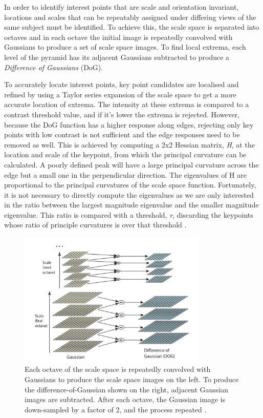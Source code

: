 \documentclass{l4proj}
\begin{document}
In order to identify interest points that are scale and orientation invariant, locations and scales that can be repeatably assigned under differing views of the same subject must be identified.  To achieve this, the scale space is separated into octaves and in each octave the initial image is repeatedly convolved with Gaussians to produce a set of scale space images. To find local extrema, each level of the pyramid has its adjacent Gaussians subtracted to produce a \textit{Difference of Gaussians} (DoG). 

To accurately locate interest points, key point candidates are localised and refined by using
a Taylor series expansion of the scale space to get a more accurate location of extrema. The
intensity at these extrema is compared to a contrast threshold value, and if it's lower the
extrema is rejected. However, because the DoG function has a higher response along edges,
rejecting only key points with low contrast is not sufficient and the edge responses need to be removed as well. This is achieved by computing a 2x2 Hessian matrix, \textit{H}, at the location and scale of the keypoint, from which the principal curvature can be calculated. A poorly defined peak will have a large principal curvature across the edge but a small one in the
perpendicular direction. The eigenvalues of H are proportional to the principal curvatures of
the scale space function. Fortunately, it is not necessary to directly compute the eigenvalues
as we are only interested in the ratio between the largest magnitude eigenvalue and the
smaller magnitude eigenvalue. This ratio is compared with a threshold, \textit{r}, discarding the
keypoints whose ratio of principle curvatures is over that threshold \citep{Lowe04}.

\begin{figure}[ht]
    \centering
    \includegraphics[width=0.8\textwidth]{l4template-master/images/gaussianPyramid.png}
    \caption{Each octave of the scale space is repeatedly convolved with Gaussians to produce the scale space images on the left. To produce the difference-of-Gaussian shown on the right, adjacent Gaussian images are subtracted. After each octave, the Gaussian image is down-sampled by a factor of 2, and the process repeated \citep{Lowe04}.}
    \label{gaussianpyramid}
\end{figure}
\end{document}
